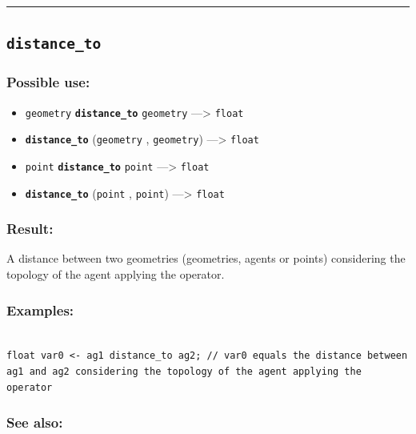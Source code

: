 \documentclass[]{book}
\providecommand{\tightlist}{%
  \setlength{\itemsep}{0pt}\setlength{\parskip}{0pt}}
\theoremstyle{definition}
\theoremstyle{definition}
\theoremstyle{definition}
\theoremstyle{remark}
\begin{document}
\begin{center}\rule{0.5\linewidth}{\linethickness}\end{center}

\subsection{\texorpdfstring{\texttt{distance\_to}}{distance\_to}}\label{distance_to}

\subsubsection{Possible use:}\label{possible-use-136}

\begin{itemize}
\tightlist
\item
  \texttt{geometry} \textbf{\texttt{distance\_to}} \texttt{geometry}
  ---\textgreater{} \texttt{float}
\item
  \textbf{\texttt{distance\_to}} (\texttt{geometry} , \texttt{geometry})
  ---\textgreater{} \texttt{float}
\item
  \texttt{point} \textbf{\texttt{distance\_to}} \texttt{point}
  ---\textgreater{} \texttt{float}
\item
  \textbf{\texttt{distance\_to}} (\texttt{point} , \texttt{point})
  ---\textgreater{} \texttt{float}
\end{itemize}

\subsubsection{Result:}\label{result-132}

A distance between two geometries (geometries, agents or points)
considering the topology of the agent applying the operator.

\subsubsection{Examples:}\label{examples-103}

\begin{verbatim}
 
float var0 <- ag1 distance_to ag2; // var0 equals the distance between ag1 and ag2 considering the topology of the agent applying the operator
\end{verbatim}

\subsubsection{See also:}\label{see-also-81}
\end{document}
